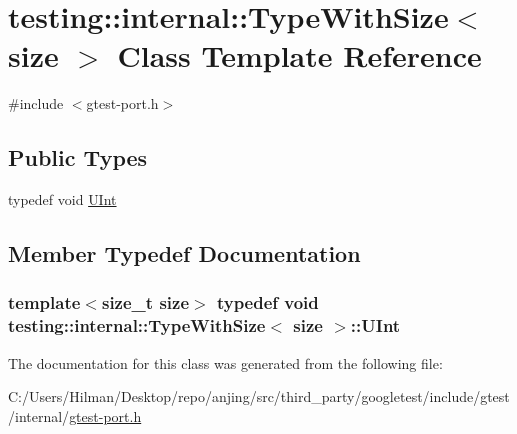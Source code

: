 \hypertarget{classtesting_1_1internal_1_1_type_with_size}{}\section{testing\+:\+:internal\+:\+:Type\+With\+Size$<$ size $>$ Class Template Reference}
\label{classtesting_1_1internal_1_1_type_with_size}


{\ttfamily \#include $<$gtest-\/port.\+h$>$}

\subsection*{Public Types}
\begin{DoxyCompactItemize}
\item 
typedef void \hyperlink{classtesting_1_1internal_1_1_type_with_size_a3898640d9f6c1e18110eef90f47a5d7b}{U\+Int}
\end{DoxyCompactItemize}


\subsection{Member Typedef Documentation}
\hypertarget{classtesting_1_1internal_1_1_type_with_size_a3898640d9f6c1e18110eef90f47a5d7b}{}
\subsubsection[{U\+Int}]{\setlength{\rightskip}{0pt plus 5cm}template$<$size\+\_\+t size$>$ typedef void {\bf testing\+::internal\+::\+Type\+With\+Size}$<$ size $>$\+::{\bf U\+Int}}\label{classtesting_1_1internal_1_1_type_with_size_a3898640d9f6c1e18110eef90f47a5d7b}


The documentation for this class was generated from the following file\+:\begin{DoxyCompactItemize}
\item 
C\+:/\+Users/\+Hilman/\+Desktop/repo/anjing/src/third\+\_\+party/googletest/include/gtest/internal/\hyperlink{gtest-port_8h}{gtest-\/port.\+h}\end{DoxyCompactItemize}
